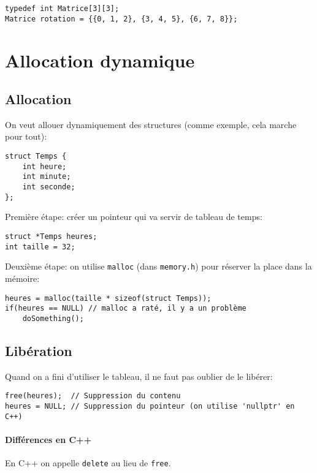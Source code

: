 \documentclass[10pt,a4paper,french]{article}
\begin{document}
\begin{verbatim}
typedef int Matrice[3][3];
Matrice rotation = {{0, 1, 2}, {3, 4, 5}, {6, 7, 8}};
\end{verbatim}

\section{Allocation dynamique}

\subsection{Allocation}

On veut allouer dynamiquement des structures (comme exemple, cela marche pour tout):

\begin{verbatim}
struct Temps {
    int heure;
    int minute;
    int seconde;
};
\end{verbatim}

Première étape: créer un pointeur qui va servir de tableau de temps:

\begin{verbatim}
struct *Temps heures;
int taille = 32;
\end{verbatim}

Deuxième étape: on utilise {\tt malloc} (dans {\tt memory.h}) pour réserver la place dans la mémoire:

\begin{verbatim}
heures = malloc(taille * sizeof(struct Temps));
if(heures == NULL) // malloc a raté, il y a un problème
    doSomething();
\end{verbatim}

\subsection{Libération}

Quand on a fini d'utiliser le tableau, il ne faut pas oublier de le libérer:

\begin{verbatim}
free(heures);  // Suppression du contenu
heures = NULL; // Suppression du pointeur (on utilise 'nullptr' en C++)
\end{verbatim}

\paragraph{Différences en C++}

En C++ on appelle {\tt delete} au lieu de {\tt free}.
\end{document}

